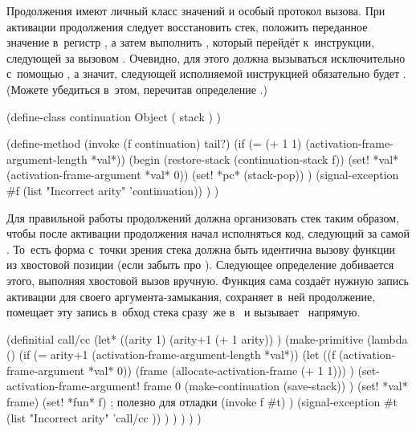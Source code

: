 Продолжения имеют личный класс значений и особый протокол вызова. При
активации продолжения следует восстановить стек, положить переданное значение
в~регистр , а затем выполнить , который перейдёт
к~инструкции, следующей за вызовом . Очевидно, для этого
 должна вызываться исключительно с~помощью , а
значит, следующей исполняемой инструкцией обязательно будет .
(Можете убедиться в~этом, перечитав определение .)

\begin{code:lisp}
(define-class continuation Object
  ( stack ) )

(define-method (invoke (f continuation) tail?)
  (if (= (+ 1 1) (activation-frame-argument-length *val*))
      (begin
        (restore-stack (continuation-stack f))
        (set! *val* (activation-frame-argument *val* 0))
        (set! *pc* (stack-pop)) )
      (signal-exception #f (list "Incorrect arity" 'continuation)) ) )
\end{code:lisp}

Для правильной работы продолжений  должна организовать стек таким
образом, чтобы после активации продолжения начал исполняться код, следующий за
самой . То~есть форма  с~точки зрения стека
должна быть идентична вызову функции~ из хвостовой позиции (если забыть
про ). Следующее определение добивается этого, выполняя
хвостовой вызов вручную. Функция  сама создаёт нужную запись
активации для своего аргумента-замыкания, сохраняет в~ней продолжение, помещает
эту запись в~обход стека сразу~же в~ и вызывает~ напрямую.

\begin{code:lisp}
(definitial call/cc
  (let* ((arity 1)
         (arity+1 (+ 1 arity)) )
    (make-primitive
      (lambda ()
        (if (= arity+1 (activation-frame-argument-length *val*))
            (let ((f (activation-frame-argument *val* 0))
                  (frame (allocate-activation-frame (+ 1 1))) )
              (set-activation-frame-argument!
               frame 0 (make-continuation (save-stack)) )
              (set! *val* frame)
              (set! *fun* f)       ; полезно для отладки
              (invoke f #t) )
            (signal-exception #t (list "Incorrect arity"
                                       'call/cc )) ) ) ) ) )
\end{code:lisp}

